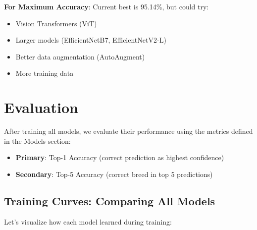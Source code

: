 \documentclass[
  letterpaper,
  DIV=11,
  numbers=noendperiod]{scrartcl}
\providecommand{\tightlist}{%
  \setlength{\itemsep}{0pt}\setlength{\parskip}{0pt}}
\begin{document}
\textbf{For Maximum Accuracy}: Current best is 95.14\%, but could try:

\begin{itemize}
\tightlist
\item
  Vision Transformers (ViT)
\item
  Larger models (EfficientNetB7, EfficientNetV2-L)
\item
  Better data augmentation (AutoAugment)
\item
  More training data
\end{itemize}

\section{Evaluation}\label{evaluation}

After training all models, we evaluate their performance using the
metrics defined in the Models section:

\begin{itemize}
\tightlist
\item
  \textbf{Primary}: Top-1 Accuracy (correct prediction as highest
  confidence)
\item
  \textbf{Secondary}: Top-5 Accuracy (correct breed in top 5
  predictions)
\end{itemize}

\subsection{Training Curves: Comparing All
Models}\label{training-curves-comparing-all-models}

Let's visualize how each model learned during training:
\end{document}
